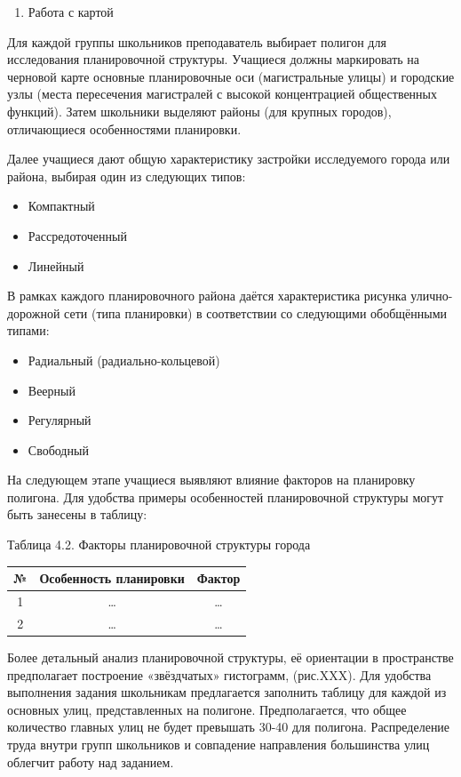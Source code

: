 \documentclass[
  11pt,
  russian,
]{book}
\providecommand{\tightlist}{%
  \setlength{\itemsep}{0pt}\setlength{\parskip}{0pt}}
\begin{document}
\begin{enumerate}
\def\labelenumi{\arabic{enumi}.}
\setcounter{enumi}{1}
\tightlist
\item
  Работа с картой
\end{enumerate}

Для каждой группы школьников преподаватель выбирает полигон для исследования планировочной структуры. Учащиеся должны маркировать на черновой карте основные планировочные оси (магистральные улицы) и городские узлы (места пересечения магистралей с высокой концентрацией общественных функций). Затем школьники выделяют районы (для крупных городов), отличающиеся особенностями планировки.

Далее учащиеся дают общую характеристику застройки исследуемого города или района, выбирая один из следующих типов:

\begin{itemize}
\item
  Компактный
\item
  Рассредоточенный
\item
  Линейный
\end{itemize}

В рамках каждого планировочного района даётся характеристика рисунка
улично-дорожной сети (типа планировки) в соответствии со следующими обобщёнными типами:

\begin{itemize}
\item
  Радиальный (радиально-кольцевой)
\item
  Веерный
\item
  Регулярный
\item
  Свободный
\end{itemize}

На следующем этапе учащиеся выявляют влияние факторов на планировку полигона. Для удобства примеры особенностей планировочной структуры могут быть занесены в таблицу:

Таблица 4.2. Факторы планировочной структуры города

\begin{longtable}[]{@{}ccc@{}}
\toprule
№ & Особенность планировки & Фактор \\
\midrule
\endhead
1 & \ldots{} & \ldots{} \\
2 & \ldots{} & \ldots{} \\
\bottomrule
\end{longtable}

Более детальный анализ планировочной структуры, её ориентации в пространстве
предполагает построение «звёздчатых» гистограмм, (рис.XXX). Для удобства
выполнения задания школьникам предлагается заполнить таблицу для каждой из
основных улиц, представленных на полигоне. Предполагается, что общее количество главных улиц не будет превышать 30-40 для полигона. Распределение труда внутри групп школьников и совпадение направления большинства улиц облегчит работу над заданием.
\end{document}
